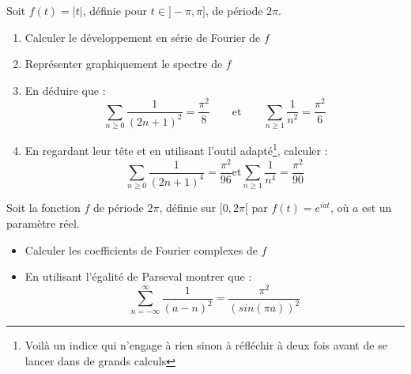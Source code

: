 \exercice
Soit $f(t)=|t|$, définie pour $t\in]-\pi,\pi]$, de période $2\pi$. 
\begin{enumerate}
\item Calculer le développement en série de Fourier de $f$
\item Représenter graphiquement le spectre de $f$
\item En déduire que :
  \begin{equation*}
    \sum_{n\geq0}\frac{1}{(2n+1)^2}=\frac{\pi^2}{8} \qquad \text{et} \qquad \sum_{n\geq1}\frac{1}{n^2}=\frac{\pi^2}{6}
  \end{equation*}
\item En regardant leur tête et en utilisant l'outil adapté\footnote{Voilà un indice qui n'engage à rien sinon à réfléchir à deux fois avant de se lancer dans de grands calculs}, calculer :
 \begin{equation*}
    \sum_{n\geq0}\frac{1}{(2n+1)^4}=\frac{\pi^2}{96} \text{et} \sum_{n\geq1}\frac{1}{n^4}=\frac{\pi^2}{90}
  \end{equation*}
\end{enumerate}

\exercice
Soit la fonction $f$ de période $2\pi$, définie sur $[0,2\pi[$ par $f(t)=e^{iat}$, où $a$ est un paramètre réel.

  
\begin{itemize}
\item Calculer les coefficients de Fourier complexes de $f$
\item En utilisant l'égalité de Parseval montrer que :
\begin{equation}
\sum_{n=-\infty}^{\infty} \frac{1}{(a-n)^2}=\frac{\pi^2}{(sin(\pi a))^2}
\end{equation}
\end{itemize}




